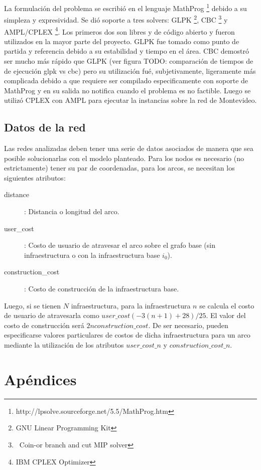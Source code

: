 \documentclass{article}
\begin{document}
  La formulación del problema se escribió en el lenguaje MathProg \footnote{http://lpsolve.sourceforge.net/5.5/MathProg.htm} debido a su simpleza y expresividad. Se dió soporte a tres solvers: GLPK \footnote{GNU Linear Programming Kit}, CBC \footnote{\ Coin-or branch and cut MIP solver} y AMPL/CPLEX \footnote{IBM CPLEX Optimizer}. Los primeros dos son libres y de código abierto y fueron utilizados en la mayor parte del proyecto. GLPK fue tomado como punto de partida y referencia debido a su estabilidad y tiempo en el área. CBC demostró ser mucho más rápido que GLPK (ver figura TODO: comparación de tiempos de de ejecución glpk vs cbc) pero su utilización fué, subjetivamente, ligeramente más complicada debido a que requiere ser compilado especificamente con soporte de MathProg y en su salida no notifica cuando el problema es no factible. Luego se utilizó CPLEX con AMPL para ejecutar la instancias sobre la red de Montevideo.

  \subsection{Datos de la red}

  Las redes analizadas deben tener una serie de datos asociados de manera que sea posible solucionarlas con el modelo planteado. Para los nodos es necesario (no estrictamente) tener su par de coordenadas, para los arcos, se necesitan los siguientes atributos:

  \begin{description}
    \item[distance]: Distancia o longitud del arco.
    \item[user\_cost]: Costo de usuario de atravesar el arco sobre el grafo base (sin infraestructura o con la infraestructura base $i_0$).
    \item[construction\_cost]: Costo de construcción de la infraestructura base.
  \end{description}

  Luego, si se tienen $N$ infraestructura, para la infraestructura $n$ se calcula el costo de usuario de atravesarla como $user\_cost (-3 (n + 1) + 28) / 25$. El valor del costo de construcción será $2 n construction\_cost$. De ser necesario, pueden especificarse valores particulares de costos de dicha infraestructura para un arco mediante la utilización de los atributos $user\_cost\_n$ y $construction\_cost\_n$.

  \section{Apéndices}
\end{document}
